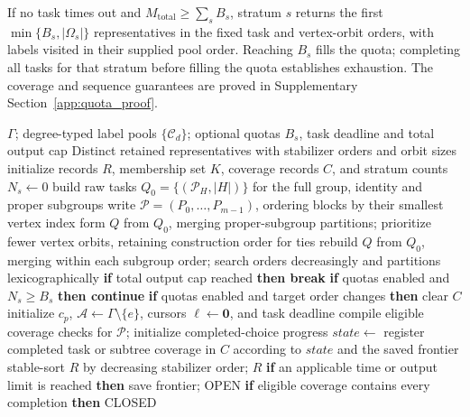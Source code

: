 \documentclass[a5paper, 10pt]{article}
\begin{document}
If no task times out and $M_{\mathrm{total}}\geq\sum_sB_s$, stratum $s$ returns the first $\min\{B_s,|\Omega_s|\}$ representatives in the fixed task and vertex-orbit orders, with labels visited in their supplied pool order. Reaching $B_s$ fills the quota; completing all tasks for that stratum before filling the quota establishes exhaustion. The coverage and sequence guarantees are proved in Supplementary Section~\ref{app:quota_proof}.

\begin{algorithm}[H]
\caption{Subgroup-Lattice Descent}
\label{alg:enum}
\scriptsize
\setlength{\baselineskip}{7.1pt}
\begin{algorithmic}[1]
\Require $\Gamma$; degree-typed label pools $\{\mathcal C_d\}$; optional quotas $B_s$, task deadline and total output cap
\Ensure Distinct retained representatives with stabilizer orders and orbit sizes
\State initialize records $R$, membership set $K$, coverage records $C$, and stratum counts $N_s\gets0$
\State build raw tasks $Q_0=\{(\mathcal P_H,|H|)\}$ for the full group, identity and proper subgroups
\State write $\mathcal P=(P_0,\ldots,P_{m-1})$, ordering blocks by their smallest vertex index
\State form $Q$ from $Q_0$, merging proper-subgroup partitions; prioritize fewer vertex orbits, retaining construction order for ties
  \State rebuild $Q$ from $Q_0$, merging within each subgroup order; search orders decreasingly and partitions lexicographically
\EndIf
{}
  \State \textbf{if} total output cap reached \textbf{then break}
  \State \textbf{if} quotas enabled and $N_s\ge B_s$ \textbf{then continue}
  \State \textbf{if} quotas enabled and target order changes \textbf{then} clear $C$
  \State initialize $c_p$, $\mathcal A\gets\Gamma\setminus\{e\}$, cursors $\boldsymbol\ell\gets\mathbf0$, and task deadline
  \State compile eligible coverage checks for $\mathcal P$; initialize completed-choice progress
  \State $state\gets$ 
  \State register completed task or subtree coverage in $C$ according to $state$ and the saved frontier
\EndFor
\State stable-sort $R$ by decreasing stabilizer order; \Return $R$
\Statex
{}
  \State \textbf{if} an applicable time or output limit is reached \textbf{then} save frontier; \Return OPEN
  \State \textbf{if} eligible coverage contains every completion \textbf{then} \Return CLOSED

\end{algorithmic}
\end{algorithm}
\end{document}
